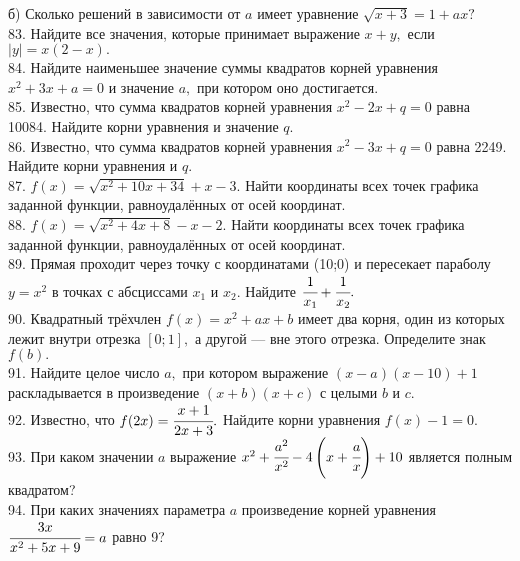 б) Сколько решений в зависимости от  $a$ имеет уравнение $\sqrt{x+3}=1+ax?$\\
83. Найдите все значения, которые принимает выражение $x+y,$ если $|y|=x(2-x).$\\
84. Найдите наименьшее значение суммы квадратов корней уравнения $x^2+3x+a=0$ и значение $a,$ при котором оно достигается.\\
85. Известно, что сумма квадратов корней уравнения $x^2-2x + q = 0$ равна 10084.
Найдите корни уравнения и значение $q.$\\
86. Известно, что сумма квадратов корней уравнения $x^2 -3x + q = 0$ равна 2249.
Найдите корни уравнения и $q.$\\
87. $f(x)=\sqrt{x^2+10x+34}+x-3.$ Найти координаты всех точек графика заданной функции,
равноудалённых от осей координат.\\
88. $f(x)=\sqrt{x^2+4x+8}-x-2.$ Найти координаты всех точек графика заданной функции,
равноудалённых от осей координат.\\
89. Прямая проходит через точку с координатами (10;0) и пересекает параболу $y=x^2$ в точках с абсциссами $x_1$ и $x_2.$ Найдите $\cfrac{1}{x_1}+\cfrac{1}{x_2}.$\\
90. Квадратный трёхчлен $f(x)=x^2+ax+b$ имеет два корня, один из которых лежит внутри отрезка  $[0;1],$ а
другой --- вне этого отрезка. Определите знак $f(b).$\\
91. Найдите целое число  $a,$ при котором выражение  $(x-a)(x-10)+1$ раскладывается в произведение $(x+b)(x+c)$ с целыми  $b$ и  $c.$\\
92. Известно, что $f(2x)=\cfrac{x+1}{2x+3}.$ Найдите корни уравнения $f(x)-1=0.$\\
93. При каком значении $a$ выражение $x^2+\cfrac{a^2}{x^2}-4\left(x+\cfrac{a}{x}\right)+10$ является полным квадратом?\\
94. При каких значениях параметра $a$ произведение корней уравнения $\cfrac{3x}{x^2+5x+9}=a$ равно 9?
\newpage
